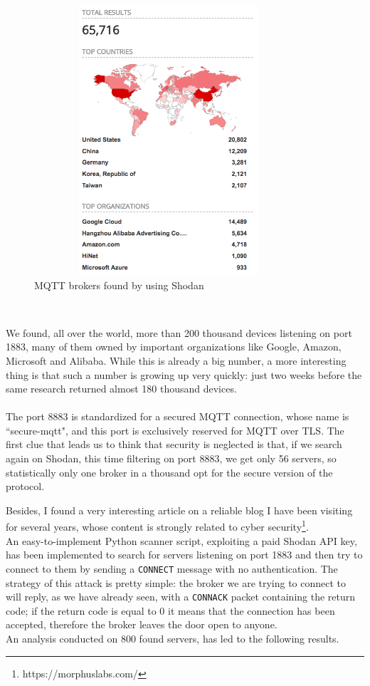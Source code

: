 \documentclass[12pt]{report}
\begin{document}
{\begin{figure}[H]
\includegraphics[width=10cm,height=10cm,keepaspectratio]{shodan_numdevices}
\centering
\caption{MQTT brokers found by using Shodan}
\label{fig:shodanres}
\end{figure}\

We found, all over the world, more than 200 thousand devices listening on port 1883, many of them owned by important organizations like Google, Amazon, Microsoft and Alibaba.
While this is already a big number, a more interesting thing is that such a number is growing up very quickly: just two weeks before the same research returned almost 180 thousand devices.\\\\
The port 8883 is standardized for a secured MQTT connection, whose name is ``secure-mqtt", and this port is exclusively reserved for MQTT over TLS.
The first clue that leads us to think that security is neglected is that, if we search again on Shodan, this time filtering on port 8883, we get only 56 servers, so statistically only one broker in a thousand opt for the secure version of the protocol.

Besides, I found a very interesting article on a reliable blog I have been visiting for several years, whose content is strongly related to cyber security\footnote{https://morphuslabs.com/}.\\
An easy-to-implement Python scanner script, exploiting a paid Shodan API key, has been implemented to search for servers listening on port 1883 and then try to connect to them by sending a \texttt{CONNECT} message with no authentication.
The strategy of this attack is pretty simple: the broker we are trying to connect to will reply, as we have already seen, with a \texttt{CONNACK} packet containing the return code; if the return code is equal to 0 it means that the connection has been accepted, therefore the broker leaves the door open to anyone.\\
An analysis conducted on 800 found servers, has led to the following results.

}
\end{document}
